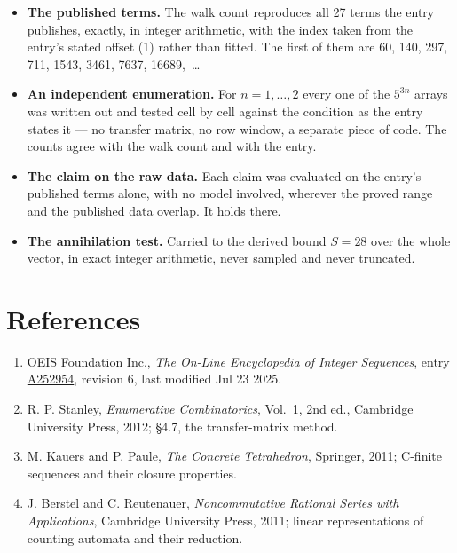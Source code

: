 \documentclass[11pt]{article}
\theoremstyle{definition}
\begin{document}
\begin{itemize}

\item {\bfseries The published terms.} The walk count reproduces all 27 terms the entry publishes, exactly, in integer arithmetic, with the index taken from the entry's stated offset (1) rather than fitted. The first of them are 60, 140, 297, 711, 1543, 3461, 7637, 16689,~\dots

\item {\bfseries An independent enumeration.} For $n = 1,\dots,2$ every one of the $5^{3n}$ arrays was written out and tested cell by cell against the condition as the entry states it --- no transfer matrix, no row window, a separate piece of code. The counts agree with the walk count and with the entry.

\item {\bfseries The claim on the raw data.} Each claim was evaluated on the entry's published terms alone, with no model involved, wherever the proved range and the published data overlap. It holds there.

\item {\bfseries The annihilation test.} Carried to the derived bound $S = 28$ over the whole vector, in exact integer arithmetic, never sampled and never truncated.

\end{itemize}

\section{References}

\begin{enumerate}

\item OEIS Foundation Inc., \emph{The On-Line Encyclopedia of Integer Sequences}, entry \href{https://oeis.org/A252954}{A252954}, revision 6, last modified Jul 23 2025.

\item R. P. Stanley, \emph{Enumerative Combinatorics}, Vol.~1, 2nd ed., Cambridge University Press, 2012; \S4.7, the transfer-matrix method.

\item M. Kauers and P. Paule, \emph{The Concrete Tetrahedron}, Springer, 2011; C-finite sequences and their closure properties.

\item J. Berstel and C. Reutenauer, \emph{Noncommutative Rational Series with Applications}, Cambridge University Press, 2011; linear representations of counting automata and their reduction.

\end{enumerate}
\end{document}
